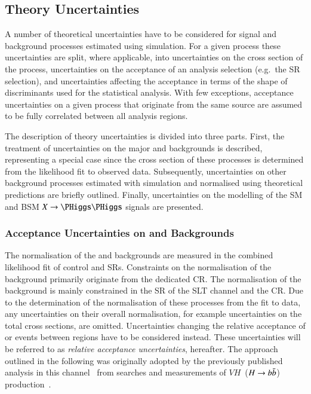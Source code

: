 \subsection{Theory Uncertainties}%
\label{sec:modelling_uncertainties}%
\label{sec:theory_uncertainties}

A number of theoretical uncertainties have to be considered for signal and
background processes estimated using simulation. For a given process these
uncertainties are split, where applicable, into uncertainties on the cross
section of the process, uncertainties on the acceptance of an analysis selection
(e.g.\ the SR selection), and uncertainties affecting the acceptance in terms of
the shape of discriminants used for the statistical analysis. With few
exceptions, acceptance uncertainties on a given process that originate from the
same source are assumed to be fully correlated between all analysis regions.

The description of theory uncertainties is divided into three parts.  First, the
treatment of uncertainties on the major \ZHF and \ttbar backgrounds is
described, representing a special case since the cross section of these
processes is determined from the likelihood fit to observed data. Subsequently,
uncertainties on other background processes estimated with simulation and
normalised using theoretical predictions are briefly outlined. Finally,
uncertainties on the modelling of the SM \HH and BSM $X \to \HH$ signals are
presented.

\subsubsection{Acceptance Uncertainties on \ZHF and \ttbar Backgrounds}

The normalisation of the \ZHF and \ttbar backgrounds are measured in the
combined likelihood fit of control and SRs. Constraints on the normalisation of
the \ZHF background primarily originate from the dedicated CR. The normalisation
of the \ttbar background is mainly constrained in the SR of the \lephad SLT
channel and the \ZHF CR. Due to the determination of the normalisation of these
processes from the fit to data, any uncertainties on their overall
normalisation, for example uncertainties on the total cross sections, are
omitted. Uncertainties changing the relative acceptance of \ZHF or \ttbar events
between regions have to be considered instead. These uncertainties will be
referred to as \emph{relative acceptance uncertainties}, hereafter. The approach
outlined in the following was originally adopted by the previously published
analysis in this channel~\cite{HIGG-2016-16-witherratum} from searches and
measurements of $VH$~($H\to b\bar{b}$)
production~\cite{HIGG-2016-29,HIGG-2018-04,HIGG-2018-51}.

